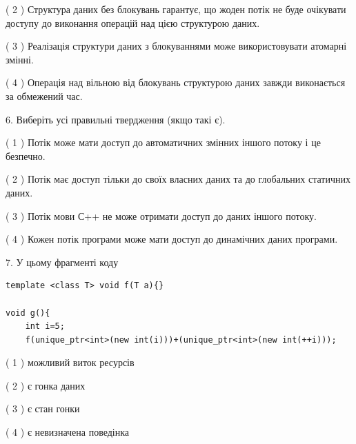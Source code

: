 \documentclass[12pt, ukrainian]{article}
\begin{document}
\begin {large}
{( 2 ) Структура даних без блокувань гарантує, що жоден потік не буде очікувати доступу до виконання операцій над цією структурою даних.%

( 3 ) Реалізація структури даних з блокуваннями може використовувати атомарні змінні.%

( 4 ) Операція над вільною від блокувань структурою даних завжди виконається за обмежений час.%
\newpage



\vspace{5mm}
6. Виберіть усі правильні твердження (якщо такі є).\par
\vspace{2mm}

( 1 ) Потік може мати доступ до автоматичних змінних іншого потоку і це безпечно.%

( 2 ) Потік має доступ тільки до своїх власних даних та до глобальних статичних даних.%

( 3 ) Потік мови С++ не може отримати доступ до даних іншого потоку.%

( 4 ) Кожен потік програми може мати доступ до динамічних даних програми.%


\vspace{5mm}
7. У цьому фрагменті коду
\begin{verbatim}
template <class T> void f(T a){}

void g(){
    int i=5;
    f(unique_ptr<int>(new int(i)))+(unique_ptr<int>(new int(++i)));
\end{verbatim}
( 1 ) можливий виток ресурсів%

( 2 ) є гонка даних%

( 3 ) є стан гонки%

( 4 ) є невизначена поведінка%
}
\end {large}
\end{document}
